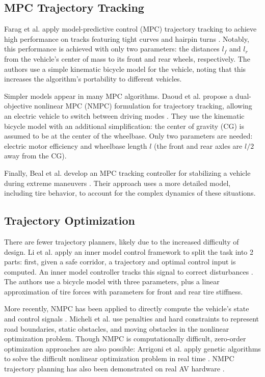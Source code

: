 \documentclass[letterpaper, 10 pt, conference]{ieeeconf}  %
\begin{document}
\subsection{MPC Trajectory Tracking}
Farag et al. apply model-predictive control (MPC) trajectory tracking to achieve high performance on tracks featuring tight curves and hairpin turns \cite{farag}. Notably, this performance is achieved with only two parameters: the distances $l_f$ and $l_r$ from the vehicle's center of mass to its front and rear wheels, respectively. The authors use a simple kinematic bicycle model for the vehicle, noting that this increases the algorithm's portability to different vehicles.

Simpler models appear in many MPC algorithms. Daoud et al. propose  a dual-objective nonlinear MPC (NMPC) formulation for trajectory tracking, allowing an electric vehicle to switch between driving modes \cite{pathfollowingMPC}. They use the kinematic bicycle model with an additional simplification: the center of gravity (CG) is assumed to be at the center of the wheelbase. Only two parameters are needed: electric motor efficiency and wheelbase length $l$ (the front and rear axles are $l/2$ away from the CG).

Finally, Beal et al. develop an MPC tracking controller for stabilizing a vehicle during extreme maneuvers \cite{beal}. Their approach uses a more detailed model, including tire behavior, to account for the complex dynamics of these situations.

\subsection{Trajectory Optimization}

There are fewer trajectory planners, likely due to the increased difficulty of design. Li et al. apply an inner model control framework to split the task into 2 parts: first, given a safe corridor, a trajectory and optimal control input is computed. An inner model controller tracks this signal to correct disturbances \cite{pathtracking}. The authors use a bicycle model with three parameters, plus a linear approximation of tire forces with parameters for front and rear tire stiffness.

More recently, NMPC has been applied to directly compute the vehicle's state and control signals \cite{nmpc_micheli}. Micheli et al. use penalties and hard constraints to represent road boundaries, static obstacles, and moving obstacles in the nonlinear optimization problem.
Though NMPC is computationally difficult, zero-order optimization approaches are also possible: Arrigoni et al. apply genetic algorithms to solve the difficult nonlinear optimization problem in real time \cite{arrigoni2021mpc}. NMPC trajectory planning has also been demonstrated on real AV hardware \cite{nmpc_platform}.
\end{document}

